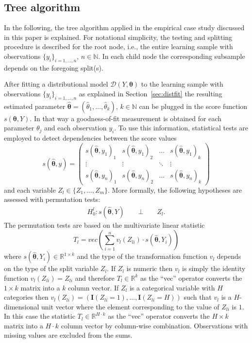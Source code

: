 \documentclass[aoas, preprint]{imsart}
\newcommand{\I}{\mathbf{I}}
\numberwithin{equation}{subsection}
\begin{document}
\pagebreak
\begin{appendix}
\section{Tree algorithm}
\label{app:tree}


In the following, the tree algorithm applied in the empirical case study 
discussed in this paper is explained. For notational simplicity, 
the testing and splitting procedure is described for the root node, i.e.,
the entire learning sample with observations $\{y_i\}_{i = 1,\ldots,n}$, $n \in \mathbb{N}$.
In each child node the corresponding subsample depends on 
the foregoing split(s).

After fitting a distributional model $\mathcal{D}(Y, \bm{\theta})$ to 
the learning sample with observations $\{y_i\}_{i = 1,\ldots,n}$ as explained in 
Section~\ref{sec:distfit} the resulting estimated parameter 
$\bm{\hat{\theta}} = 
(\hat{\theta}_1, \ldots, \hat{\theta}_k)$, $k \in \mathbb{N}$ 
can be plugged in the score function $s(\bm{\theta}, Y)$.
In that way a goodness-of-fit measurement is obtained for each
parameter $\theta_j$ and each observation $y_i$.
To use this information, statistical tests are employed to detect
dependencies between the score values
\begin{equation}
s(\bm{\hat{\theta}}, y) = 
\begin{pmatrix} 
s(\bm{\hat{\theta}}, y_1)_1 & s(\bm{\hat{\theta}}, y_1)_2 & \ldots & s(\bm{\hat{\theta}}, y_1)_k\\
\vdots & \vdots & \ddots & \vdots \\
s(\bm{\hat{\theta}}, y_n)_1 & s(\bm{\hat{\theta}}, y_n)_2 & \ldots & s(\bm{\hat{\theta}}, y_n)_k
\end{pmatrix}
\end{equation}
and each variable $Z_l \in \{Z_1, \ldots, Z_m\}$.  
More formally, the following hypotheses are assessed with permutation tests:
\begin{align}
H_0^l:  s(\bm{\hat{\theta}}, Y) \qquad \bot \qquad Z_l.
\end{align}
%
The permutation tests are based on the multivariate linear statistic
\begin{equation}
T_l = vec\left(\sum_{i=1}^n v_l(Z_{li}) \cdot s(\bm{\hat{\theta}}, Y_i)\right)
\end{equation}
where $s(\bm{\hat{\theta}}, Y_i) \in \mathbb{R}^{1\times k}$ and the 
type of the transformation function $v_l$ depends on the type of the split 
variable $Z_l$. If $Z_l$ is numeric then $v_l$ is simply the identity 
function $v_l(Z_{li}) = Z_{li}$ and therefore $T_l \in \mathbb{R}^k$ as 
the ``vec'' operator converts the $1 \times k$ matrix into a $k$ column vector. 
If $Z_l$ is a categorical variable with $H$ categories then 
$v_l(Z_{li}) = (\I(Z_{li} = 1), \ldots, \I(Z_{li} = H))$ 
such that $v_l$ is a $H$-dimensional unit vector where the element corresponding to 
the value of $Z_{li}$ is $1$. In this case the statistic $T_l \in \mathbb{R}^{H \cdot k}$
as the ``vec'' operator converts the $H \times k$ matrix into a $H \cdot k$ column vector 
by column-wise combination. Observations with missing values are excluded from the sums.


\end{appendix}
\end{document}
